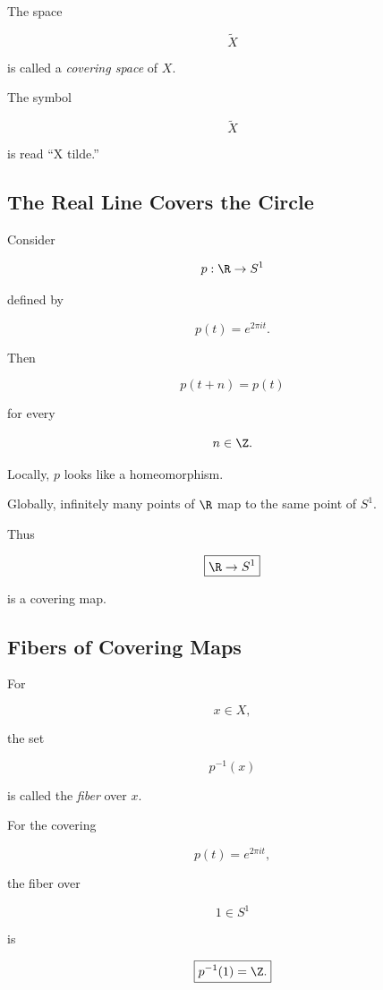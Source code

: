The space

\[
\widetilde{X}
\]

is called a \emph{covering space} of \(X\).

The symbol

\[
\widetilde{X}
\]

is read ``X tilde.''

\subsection{The Real Line Covers the Circle}
\label{subsec:real-line-covers-circle}

Consider

\[
p:\R\to S^1
\]

defined by

\[
\boxed{
p(t)=e^{2\pi i t}.
}
\]

Then

\[
p(t+n)=p(t)
\]

for every

\[
n\in\Z.
\]

Locally, \(p\) looks like a homeomorphism.

Globally, infinitely many points of \(\R\) map to the same point of \(S^1\).

Thus

\[
\boxed{
\R\to S^1
}
\]

is a covering map.

\subsection{Fibers of Covering Maps}
\label{subsec:covering-fibers}

For

\[
x\in X,
\]

the set

\[
\boxed{
p^{-1}(x)
}
\]

is called the \emph{fiber} over \(x\).

For the covering

\[
p(t)=e^{2\pi i t},
\]

the fiber over

\[
1\in S^1
\]

is

\[
\boxed{
p^{-1}(1)=\Z.
}
\]

